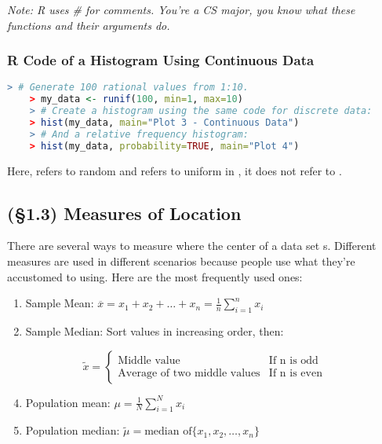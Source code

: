 \documentclass[../Notes.tex]{subfiles}
\begin{document}
\emph{Note: R uses \# for comments. You're a CS major, you know what these functions and their arguments do.}

\subsubsection{R Code of a Histogram Using Continuous Data}

\begin{lstlisting}[language=R]
    > # Generate 100 rational values from 1:10.
    > my_data <- runif(100, min=1, max=10)
    > # Create a histogram using the same code for discrete data:
    > hist(my_data, main="Plot 3 - Continuous Data")
    > # And a relative frequency histogram:
    > hist(my_data, probability=TRUE, main="Plot 4")
\end{lstlisting}

    Here,  refers to random and  refers to uniform in , it does not refer to  .

    \subsection*{(\S 1.3) Measures of Location}

    There are several ways to measure where the center of a data set s. Different measures are used in different scenarios because people use what they're accustomed to using. Here are the most frequently used ones:

    \begin{enumerate}
        \item Sample Mean: $\overline{x} = x_1 + x_2 + \dots + x_n = \frac{1}{n}\sum\limits_{i=1}^{n}x_i$
        \item Sample Median: Sort values in increasing order, then:
    \end{enumerate}

    \begin{equation*}
        \tilde{x} = 
        \left\{
            \begin{array}{lr}
                \text{Middle value} & \text{If n is odd} \\
                \text{Average of two middle values} & \text{If n is even}
            \end{array}
        \right.
    \end{equation*}

    \begin{enumerate}
        \setcounter{enumi}{3}
        \item Population mean: $\mu = \frac{1}{N}\sum\limits_{i=1}^{N}x_i$
        \item Population median: $\tilde{\mu} = \text{median of} \{x_1, x_2, \dots, x_n\}$
    \end{enumerate}
\end{document}

